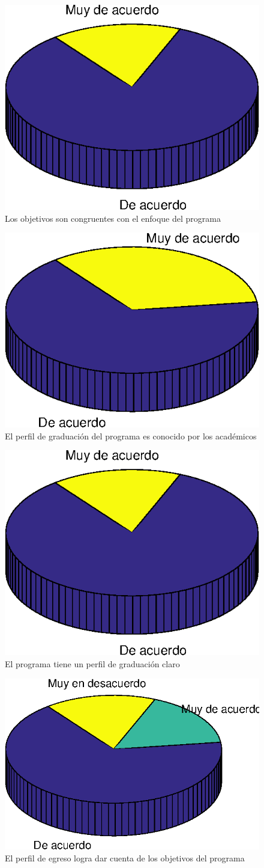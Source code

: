 \begin{figure}[ht]
\centering
\includegraphics[width=0.5\columnwidth]{./figure/graph9.eps}
\caption{Los objetivos son congruentes con el enfoque del programa}
\label{graph9}
\end{figure}

\begin{figure}[ht]
\centering
\includegraphics[width=0.5\columnwidth]{./figure/graph10.eps}
\caption{El perfil de graduación del programa es conocido por los académicos}
\label{graph10}
\end{figure}

\begin{figure}[ht]
\centering
\includegraphics[width=0.5\columnwidth]{./figure/graph11.eps}
\caption{El programa tiene un perfil de graduación claro}
\label{graph11}
\end{figure}

\begin{figure}[ht]
\centering
\includegraphics[width=0.5\columnwidth]{./figure/graph12.eps}
\caption{El perfil de egreso logra dar cuenta de los objetivos del programa}
\label{graph12}
\end{figure}

